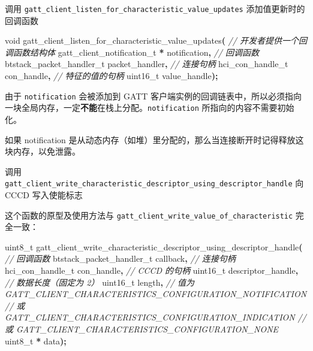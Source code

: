 \documentclass[
  12pt,
]{book}
\makeatletter
\newenvironment{Shaded}{\begin{snugshade}}{\end{snugshade}}
\newcommand{\CommentTok}[1]{\textcolor[rgb]{0.56,0.35,0.01}{\textit{#1}}}
\newcommand{\DataTypeTok}[1]{\textcolor[rgb]{0.13,0.29,0.53}{#1}}
\newcommand{\NormalTok}[1]{#1}
\newcommand{\OperatorTok}[1]{\textcolor[rgb]{0.81,0.36,0.00}{\textbf{#1}}}
\newenvironment{kframe}{%
\medskip{}
\setlength{\fboxsep}{.8em}
 \def\at@end@of@kframe{}%
 \ifinner\ifhmode%
  \def\at@end@of@kframe{\end{minipage}}%
  \begin{minipage}{\columnwidth}%
 \fi\fi%
 \def\FrameCommand##1{\hskip\@totalleftmargin \hskip-\fboxsep
 \colorbox{shadecolor}{##1}\hskip-\fboxsep
     \hskip-\linewidth \hskip-\@totalleftmargin \hskip\columnwidth}%
 \MakeFramed {\advance\hsize-\width
   \@totalleftmargin\z@ \linewidth\hsize
   \@setminipage}}%
 {\par\unskip\endMakeFramed%
 \at@end@of@kframe}
\newenvironment{rmdblock}[1]
  {
  \begin{itemize}
  \renewcommand{\labelitemi}{
    \raisebox{-.7\height}[0pt][0pt]{
      {\setkeys{Gin}{width=3em,keepaspectratio}\texttt{[image: images/\#1]}}
    }
  }
  \setlength{\fboxsep}{1em}
  \begin{kframe}
  \item
  }
  {
  \end{kframe}
  \end{itemize}
  }
\newenvironment{rmdcaution}
  {\begin{rmdblock}{caution}}
  {\end{rmdblock}}
\makeatother
\begin{document}
\begin{enumerate}
\def\labelenumi{\arabic{enumi}.}
\item
  调用 \texttt{gatt\_client\_listen\_for\_characteristic\_value\_updates} 添加值更新时的回调函数

\begin{Shaded}
\begin{Highlighting}[]
\DataTypeTok{void}\NormalTok{ gatt\_client\_listen\_for\_characteristic\_value\_updates}\OperatorTok{(}
    \CommentTok{// 开发者提供一个回调函数结构体}
\NormalTok{    gatt\_client\_notification\_t }\OperatorTok{*}\NormalTok{ notification}\OperatorTok{,}
    \CommentTok{// 回调函数}
\NormalTok{    btstack\_packet\_handler\_t packet\_handler}\OperatorTok{,}
    \CommentTok{// 连接句柄}
\NormalTok{    hci\_con\_handle\_t con\_handle}\OperatorTok{,}
    \CommentTok{// 特征的值的句柄}
    \DataTypeTok{uint16\_t}\NormalTok{ value\_handle}\OperatorTok{);}
\end{Highlighting}
\end{Shaded}

  由于 \texttt{notification} 会被添加到 GATT 客户端实例的回调链表中，所以必须指向一块全局内存，一定\textbf{不能}在栈上分配。\texttt{notification} 所指向的内容不需要初始化。

  \begin{rmdcaution}
   如果 notification
   是从动态内存（如堆）里分配的，那么当连接断开时记得释放这块内存，以免泄露。
   \end{rmdcaution}
\item
  调用 \texttt{gatt\_client\_write\_characteristic\_descriptor\_using\_descriptor\_handle} 向 CCCD 写入使能标志

  这个函数的原型及使用方法与 \texttt{gatt\_client\_write\_value\_of\_characteristic} 完全一致：

\begin{Shaded}
\begin{Highlighting}[]
\DataTypeTok{uint8\_t}\NormalTok{ gatt\_client\_write\_characteristic\_descriptor\_using\_descriptor\_handle}\OperatorTok{(}
    \CommentTok{// 回调函数}
\NormalTok{    btstack\_packet\_handler\_t callback}\OperatorTok{,}
    \CommentTok{// 连接句柄}
\NormalTok{    hci\_con\_handle\_t con\_handle}\OperatorTok{,}
    \CommentTok{// CCCD 的句柄}
    \DataTypeTok{uint16\_t}\NormalTok{ descriptor\_handle}\OperatorTok{,}
    \CommentTok{// 数据长度（固定为 2）}
    \DataTypeTok{uint16\_t}\NormalTok{ length}\OperatorTok{,}
    \CommentTok{// 值为 GATT\_CLIENT\_CHARACTERISTICS\_CONFIGURATION\_NOTIFICATION}
    \CommentTok{// 或   GATT\_CLIENT\_CHARACTERISTICS\_CONFIGURATION\_INDICATION}
    \CommentTok{// 或   GATT\_CLIENT\_CHARACTERISTICS\_CONFIGURATION\_NONE}
    \DataTypeTok{uint8\_t}  \OperatorTok{*}\NormalTok{ data}\OperatorTok{);}
\end{Highlighting}
\end{Shaded}


\end{enumerate}
\end{document}
